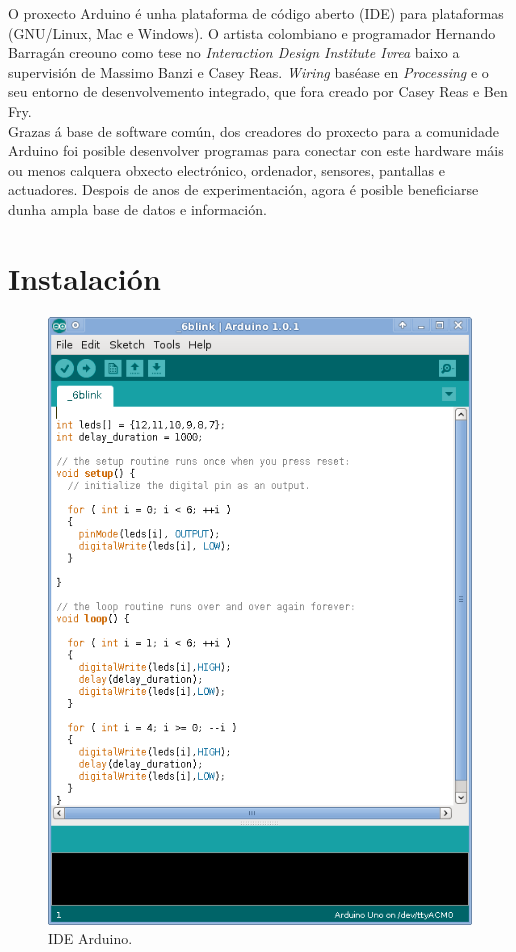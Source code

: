 O proxecto Arduino é unha plataforma de código aberto (IDE) para plataformas
(GNU/Linux, Mac e Windows). O artista colombiano e programador
Hernando Barragán creouno como tese no
\textit{Interaction Design Institute Ivrea} baixo a supervisión de
Massimo Banzi e Casey Reas. \textit{Wiring} baséase en \textit{Processing} e o
seu entorno de desenvolvemento integrado, que fora creado por Casey Reas e Ben
Fry. \\

Grazas á base de software común, dos creadores do proxecto para a comunidade
Arduino foi posible desenvolver programas para conectar con este hardware máis
ou menos calquera obxecto electrónico, ordenador, sensores, pantallas e
actuadores. Despois de anos de experimentación, agora é posible beneficiarse
dunha ampla base de datos e información.

\section{Instalación}

\begin{figure}[htbp]
 \centering
 \includegraphics[scale=0.3,keepaspectratio=true]{./imagenes/arduino-sketch.png}
 \caption{IDE Arduino.}
 \label{figura:ArduinoSketch}
\end{figure}

